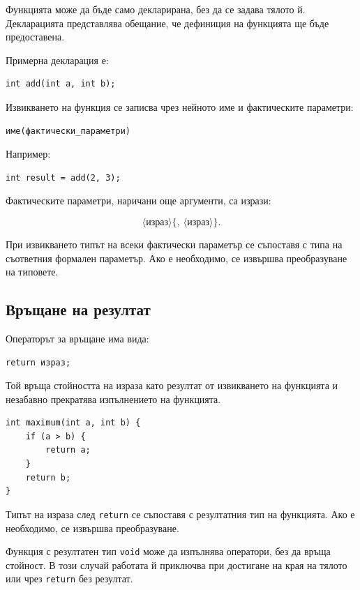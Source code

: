 Функцията може да бъде само декларирана, без да се задава тялото й. Декларацията представлява обещание, че дефиниция на функцията ще бъде предоставена.

Примерна декларация е:

\begin{verbatim}
int add(int a, int b);
\end{verbatim}

Извикването на функция се записва чрез нейното име и фактическите параметри:

\begin{verbatim}
име(фактически_параметри)
\end{verbatim}

Например:

\begin{verbatim}
int result = add(2, 3);
\end{verbatim}

Фактическите параметри, наричани още аргументи, са изрази:

\[
\langle\text{израз}\rangle
\{
,\ \langle\text{израз}\rangle
\}.
\]

При извикването типът на всеки фактически параметър се съпоставя с типа на съответния формален параметър. Ако е необходимо, се извършва преобразуване на типовете.

\subsection{Връщане на резултат}\label{s:14.6.3}

Операторът за връщане има вида:

\begin{verbatim}
return израз;
\end{verbatim}

Той връща стойността на израза като резултат от извикването на функцията и незабавно прекратява изпълнението на функцията.

\begin{example}
\begin{verbatim}
int maximum(int a, int b) {
    if (a > b) {
        return a;
    }
    return b;
}
\end{verbatim}
\end{example}

Типът на израза след \texttt{return} се съпоставя с резултатния тип на функцията. Ако е необходимо, се извършва преобразуване.

Функция с резултатен тип \texttt{void} може да изпълнява оператори, без да връща стойност. В този случай работата й приключва при достигане на края на тялото или чрез \texttt{return} без резултат.

